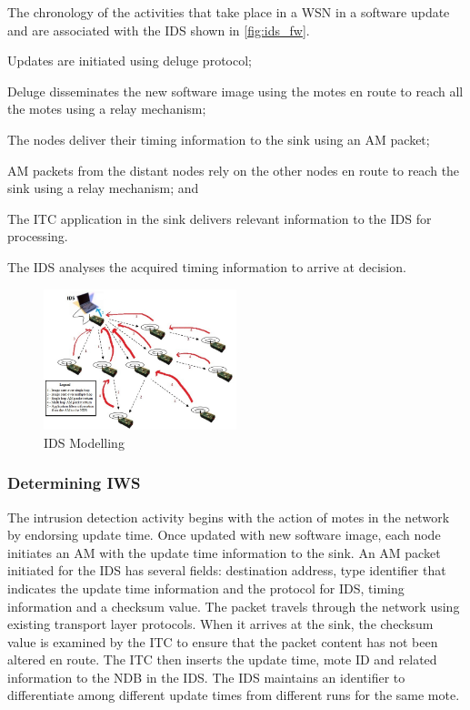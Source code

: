 \documentclass[conference,final]{IEEEtran}
\begin{document}
The chronology of the activities that take place in a WSN in a software  update and are associated with the IDS shown in \ref{fig:ids_fw}.
\begin{inparaenum}
\item Updates are initiated using deluge protocol;
\item Deluge disseminates the new software image using the motes en route to reach all the motes using a relay mechanism; 
\item The nodes deliver their timing information to the sink using an AM packet;
\item AM packets from the distant nodes rely on the other nodes en route to reach the sink using a relay mechanism; and
\item The ITC application in the sink delivers relevant information to the IDS for processing. 
\end{inparaenum}
The IDS analyses the acquired timing information to arrive at decision.
\begin{figure}[btp]
    \centering
    \includegraphics[width=0.5\textwidth]{IDS}
    \caption{IDS Modelling}
    \label{fig:ids_model}
\end{figure}

\subsubsection{Determining IWS}
\label{ssc:cal_iws}

The intrusion detection activity begins with the action of motes in the network by endorsing update time. 
Once updated with new software image, each node initiates an AM with the update time information to the sink. 
An AM packet initiated for the IDS has several fields: destination address, type identifier that indicates the update time information and the protocol for IDS, timing information and a checksum value.
The packet travels through the network using existing transport layer protocols.
When it arrives at the sink, the checksum value is examined by the ITC to ensure that the packet content has not been altered en route.
The ITC then inserts the update time, mote ID and related information to the NDB in the IDS.
The IDS maintains an identifier to differentiate among different update times from different runs for the same mote.
\end{document}

